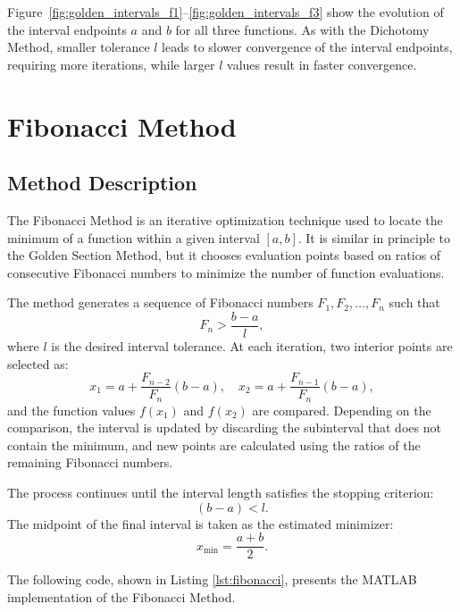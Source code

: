 \documentclass[11pt]{article}
\begin{document}
Figure~\ref{fig:golden_intervals_f1}--\ref{fig:golden_intervals_f3} show the evolution of the interval endpoints $a$ and $b$ for all three functions.  
As with the Dichotomy Method, smaller tolerance $l$ leads to slower convergence of the interval endpoints, requiring more iterations, while larger $l$ values result in faster convergence.
\newpage

\section{Fibonacci Method}

\subsection{Method Description}

The Fibonacci Method is an iterative optimization technique used to locate the minimum of a function within a given interval $[a, b]$.  
It is similar in principle to the Golden Section Method, but it chooses evaluation points based on ratios of consecutive Fibonacci numbers to minimize the number of function evaluations.

The method generates a sequence of Fibonacci numbers $F_1, F_2, \dots, F_n$ such that
\[
F_n > \frac{b-a}{l},
\]
where $l$ is the desired interval tolerance. At each iteration, two interior points are selected as:
\[
x_1 = a + \frac{F_{n-2}}{F_n} (b-a), \quad
x_2 = a + \frac{F_{n-1}}{F_n} (b-a),
\]
and the function values $f(x_1)$ and $f(x_2)$ are compared.  
Depending on the comparison, the interval is updated by discarding the subinterval that does not contain the minimum, and new points are calculated using the ratios of the remaining Fibonacci numbers.  

The process continues until the interval length satisfies the stopping criterion:
\[
(b - a) < l.
\]
The midpoint of the final interval is taken as the estimated minimizer:
\[
x_{\text{min}} = \frac{a+b}{2}.
\]

The following code, shown in Listing \ref{lst:fibonacci}, presents the MATLAB implementation of the Fibonacci Method.
\end{document}
